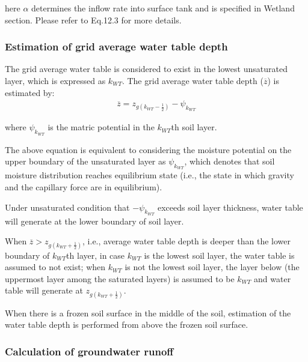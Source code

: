 here \(\alpha\) determines the inflow rate into surface tank and is specified in Wetland section. Please refer to Eq.12.3 for more details.

\hypertarget{estimation-of-grid-average-water-table-depth}{%
\subsubsection{Estimation of grid average water table depth}\label{estimation-of-grid-average-water-table-depth}}

The grid average water table is considered to exist in the lowest unsaturated layer, which is expressed as \(k_{WT}\). The grid average water table depth (\(\overline{z}\)) is estimated by: \begin{eqnarray}
\overline{z} = z_{g(k_{WT}-\frac1 2)} - \psi_{k_{WT}}
\label{eq279}
\end{eqnarray}

where \(\psi_{k_{WT}}\) is the matric potential in the \(k_{WT}\)th soil layer.

The above equation is equivalent to considering the moisture potential on the upper boundary of the unsaturated layer as \(\psi_{k_{WT}}\), which denotes that soil moisture distribution reaches
equilibrium state (i.e., the state in which gravity and the capillary force are in equilibrium).

Under unsaturated condition that \(-\psi_{k_{WT}}\) exceeds soil layer thickness, water table will generate at the lower boundary of soil layer.

When \(\overline{z} > z_{g(k_{WT}+\frac{1}2)}\), i.e., average water table depth is deeper than the lower boundary of \(k_{WT}\)th layer, in case \(k_{WT}\) is the lowest soil layer, the water table
is assumed to not exist; when \(k_{WT}\) is not the lowest soil layer, the layer below (the uppermost layer among the saturated layers) is assumed to be \(k_{WT}\) and water table will generate at
\(z_{g(k_{WT}+\frac{1}2)}\).

When there is a frozen soil surface in the middle of the soil, estimation of the water table depth is performed from above the frozen soil surface.

\hypertarget{calculation-of-groundwater-runoff}{%
\subsubsection{Calculation of groundwater runoff}\label{calculation-of-groundwater-runoff}}

